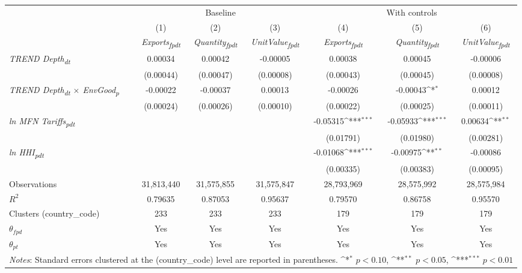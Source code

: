 {
\def\sym#1{\ifmmode^{#1}\else\(^{#1}\)\fi}
\begin{tabular}{l*{6}{c}}
\toprule
&\multicolumn{3}{c}{Baseline}&\multicolumn{3}{c}{With controls}\\\cmidrule(lr){2-4}\cmidrule(lr){5-7}
&(1)&(2)&(3)&(4)&(5)&(6)\\
&\textit{Exports\textsubscript{fpdt}}&\textit{Quantity\textsubscript{fpdt}}&\textit{UnitValue\textsubscript{fpdt}}&\textit{Exports\textsubscript{fpdt}}&\textit{Quantity\textsubscript{fpdt}}&\textit{UnitValue\textsubscript{fpdt}}\\
\midrule
\textit{TREND Depth\textsubscript{dt}} & 0.00034 & 0.00042 & -0.00005 & 0.00038 & 0.00045 & -0.00006\\
 & (0.00044) & (0.00047) & (0.00008) & (0.00043) & (0.00045) & (0.00008)\\
\addlinespace
\textit{TREND Depth\textsubscript{dt} $\times$ EnvGood\textsubscript{p}} & -0.00022 & -0.00037 & 0.00013 & -0.00026 & -0.00043\sym{*} & 0.00012\\
 & (0.00024) & (0.00026) & (0.00010) & (0.00022) & (0.00025) & (0.00011)\\
\addlinespace
\textit{ln MFN Tariffs\textsubscript{pdt}} &  &  &  & -0.05315\sym{***} & -0.05933\sym{***} & 0.00634\sym{**}\\
 &  &  &  & (0.01791) & (0.01980) & (0.00281)\\
\addlinespace
\textit{ln HHI\textsubscript{pdt}} &  &  &  & -0.01068\sym{***} & -0.00975\sym{**} & -0.00086\\
 &  &  &  & (0.00335) & (0.00383) & (0.00095)\\
\midrule
Observations & 31,813,440 & 31,575,855 & 31,575,847 & 28,793,969 & 28,575,992 & 28,575,984\\
$R^{2}$ & 0.79635 & 0.87053 & 0.95637 & 0.79570 & 0.86758 & 0.95570\\
Clusters (country_code) & 233 & 233 & 233 & 179 & 179 & 179\\
$\theta_{fpd}$ & Yes & Yes & Yes & Yes & Yes & Yes\\
$\theta_{pt}$ & Yes & Yes & Yes & Yes & Yes & Yes\\
\bottomrule
\multicolumn{7}{l}{\footnotesize \textit{Notes}: Standard errors clustered at the (country_code) level are reported in parentheses. \sym{*} \(p<0.10\), \sym{**} \(p<0.05\), \sym{***} \(p<0.01\)}\\
\end{tabular}
}
